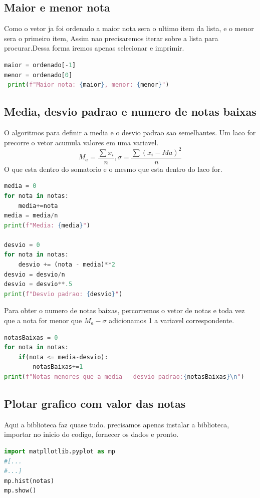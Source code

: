 \documentclass{article}
\begin{document}
\subsection{Maior e menor nota}
Como o vetor ja foi ordenado a maior nota sera o ultimo item da lista, e o menor sera o primeiro item, Assim nao precisaremos iterar sobre a lista para procurar.Dessa forma iremos apenas selecionar e imprimir.

\begin{lstlisting}[language=Python]
 maior = ordenado[-1]
menor = ordenado[0]
 print(f"Maior nota: {maior}, menor: {menor}")
\end{lstlisting}

\subsection{Media, desvio padrao e numero de notas baixas}
O algoritmos para definir a media e o desvio padrao sao semelhantes. Um laco for precorre o vetor acumula valores em uma variavel.
\[
M_a = \frac{\sum x_i}{n}, \sigma = \frac{\sum(x_i-Ma)^2}{n}
\]
O que esta dentro do somatorio e o mesmo que esta dentro do laco for.
\begin{lstlisting}[language=Python]
media = 0
for nota in notas:
    media+=nota
media = media/n
print(f"Media: {media}")

desvio = 0
for nota in notas:
    desvio += (nota - media)**2
desvio = desvio/n
desvio = desvio**.5
print(f"Desvio padrao: {desvio}")   
\end{lstlisting}
Para obter o numero de notas baixas, percorremos o vetor de notas e toda vez que a nota for menor que $M_a - \sigma$ adicionamos 1 a variavel correspondente.

\begin{lstlisting}[language=Python]
notasBaixas = 0
for nota in notas:
    if(nota <= media-desvio):
        notasBaixas+=1
print(f"Notas menores que a media - desvio padrao:{notasBaixas}\n")
\end{lstlisting}

\subsection{Plotar grafico com valor das notas}
Aqui a biblioteca faz quase tudo. precisamos apenas instalar a biblioteca, importar no inicio do codigo, fornecer os dados e pronto.

\begin{lstlisting}[language=Python]
import matpllotlib.pyplot as mp
#[...
#...]
mp.hist(notas)
mp.show()
\end{lstlisting}
\end{document}
